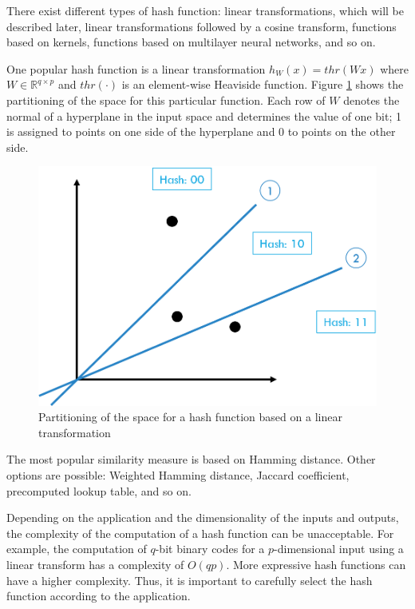 There exist different types of hash function: linear transformations, which will be described later, linear transformations followed by a cosine transform, functions based on kernels, functions based on multilayer neural networks, and so on.

One popular hash function is a linear transformation $h_W(x)=thr(Wx)$ where $W\in\mathbb{R}^{q\times{}p}$ and $thr(\cdot)$ is an element-wise Heaviside function. Figure \ref{fig:lsh} shows the partitioning of the space for this particular function. Each row of $W$ denotes the normal of a hyperplane in the input space and determines the value of one bit; 1 is assigned to points on one side of the hyperplane and 0 to points on the other side.

\begin{figure}
	\centering
	\includegraphics[height=0.3\textheight]{img/lsh.png}
	\caption{Partitioning of the space for a hash function based on a linear transformation}
	\label{fig:lsh}
\end{figure}

The most popular similarity measure is based on Hamming distance. Other options are possible: Weighted Hamming distance, Jaccard coefficient, precomputed lookup table, and so on.

Depending on the application and the dimensionality of the inputs and outputs, the complexity of the computation of a hash function can be unacceptable. For example, the computation of $q$-bit binary codes for a $p$-dimensional input using a linear transform has a complexity of $O(qp)$. More expressive hash functions can have a higher complexity. Thus, it is important to carefully select the hash function according to the application.

